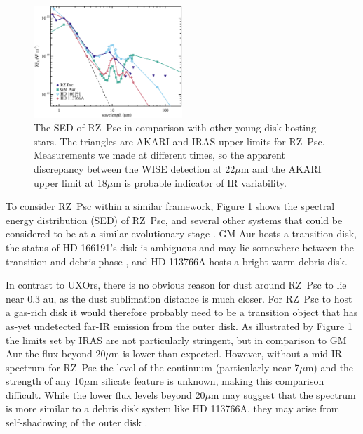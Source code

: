 \documentclass[useAMS,usenatbib,usegraphicx]{mn2e}
\begin{document}
\begin{figure}
  \begin{center}
    \hspace{-0.5cm} \includegraphics[width=0.5\textwidth]{figs/spcomp.eps}
    \caption{The SED of RZ~Psc in comparison with other young disk-hosting stars. The
      triangles are AKARI and IRAS upper limits for RZ~Psc. Measurements we made at
      different times, so the apparent discrepancy between the WISE detection at 22$\mu$m
      and the AKARI upper limit at 18$\mu$m is probable indicator of IR
      variability.}\label{fig:spcomp}
  \end{center}
\end{figure}

To consider RZ~Psc within a similar framework, Figure \ref{fig:spcomp} shows the spectral
energy distribution (SED) of RZ~Psc, and several other systems that could be considered
to be at a similar evolutionary stage \citep[a similar plot appeared
in][]{2014MNRAS.tmp...88K}. GM Aur hosts a transition disk, the status of HD 166191's
disk is ambiguous and may lie somewhere between the transition and debris phase
\citep{2013arXiv1308.0405S,2014MNRAS.tmp...88K}, and HD 113766A hosts a bright warm
debris disk.

In contrast to UXOrs, there is no obvious reason for dust around RZ~Psc to lie near 0.3
au, as the dust sublimation distance is much closer. For RZ~Psc to host a gas-rich disk
it would therefore probably need to be a transition object that has as-yet undetected
far-IR emission from the outer disk. As illustrated by Figure \ref{fig:spcomp} the limits
set by IRAS are not particularly stringent, but in comparison to GM Aur the flux beyond
20$\mu$m is lower than expected. However, without a mid-IR spectrum for RZ~Psc the level
of the continuum (particularly near 7$\mu$m) and the strength of any 10$\mu$m silicate
feature is unknown, making this comparison difficult. While the lower flux levels beyond
20$\mu$m may suggest that the spectrum is more similar to a debris disk system like HD
113766A, they may arise from self-shadowing of the outer disk \citep[though as noted
by][finding parameters for shadowed outer T~Tauri disks is more difficult than for Herbig
Ae/Be stars]{2003ApJ...594L..47D}.
\end{document}
